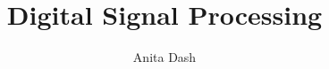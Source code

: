\documentclass[journal,12pt,twocolumn]{IEEEtran}
\begin{document}
\title{ 
Digital Signal Processing
}

%
%
%

\author{Anita Dash}
% 
%



% 
\end{document}
